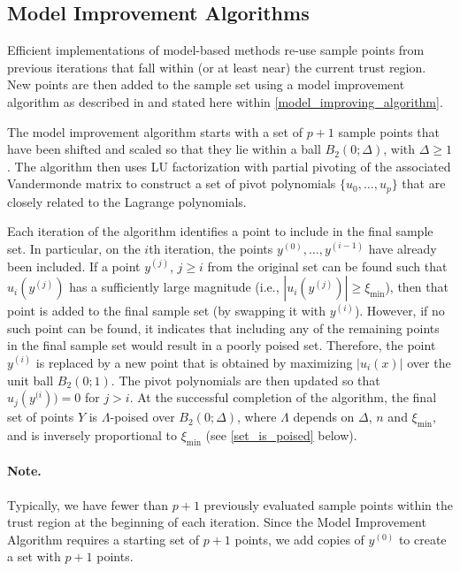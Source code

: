 \documentclass{article}
\begin{document}
\subsection{Model Improvement Algorithms}

\label{model_improvement_algorithms}
Efficient implementations of model-based methods re-use sample points from previous iterations that fall within (or at least near) the current trust region.
New points are then added to the sample set using a model improvement algorithm as described in 
\cite{introduction_book} and stated here within \cref{model_improving_algorithm}.

The model improvement algorithm starts with a set of $p+1$ sample points that have been shifted and scaled so that they lie within a ball $B_2(0;\Delta)$, with $\Delta \ge 1$.   
The algorithm then uses LU factorization with partial pivoting of the 
associated Vandermonde matrix to construct a set of pivot polynomials $\{u_0, \ldots, u_p\}$ that are closely related to the Lagrange polynomials. 


Each iteration of the algorithm identifies a point to include in the final sample set.
In particular, on the $i$th iteration, the points $y^{(0)}, \ldots, y^{(i-1)}$ have already been included.   
If a point $y^{(j)}$,  $j \ge i$ from the original set can be found such that 
$u_i(y^{(j)})$ has a sufficiently large magnitude  (i.e.,  $|u_i(y^{(j)})| \ge \xi_{\min}$),  
then that point is added to the final sample set (by swapping it with $y^{(i)}$).
However, if no such point can be found, 
it indicates that including any of the remaining points in the final sample set would result in a poorly poised set.
Therefore, the point $y^{(i)}$ is replaced by a new point that is obtained by maximizing $|u_i(x)|$ 
over the unit ball $B_2(0;1)$.
The pivot polynomials are then updated so that 
$u_j(y^{(i})) = 0$ for $j > i$.
At the successful completion of the algorithm, the final set of points $Y$ is $\Lambda$-poised over $B_2(0;\Delta)$,
where $\Lambda$ depends on $\Delta$,  $n$ and $\xi_{\min}$,  and is inversely proportional to $\xi_{\min}$
(see \cref{set_is_poised} below).
\paragraph*{Note.}
Typically,  we have fewer than $p+1$ previously evaluated sample points within the trust region at the beginning of each iteration.
Since the Model Improvement Algorithm requires a starting set of $p+1$ points, 
we add copies of $y^{(0)}$ to create a set with $p+1$ points.
\end{document}

